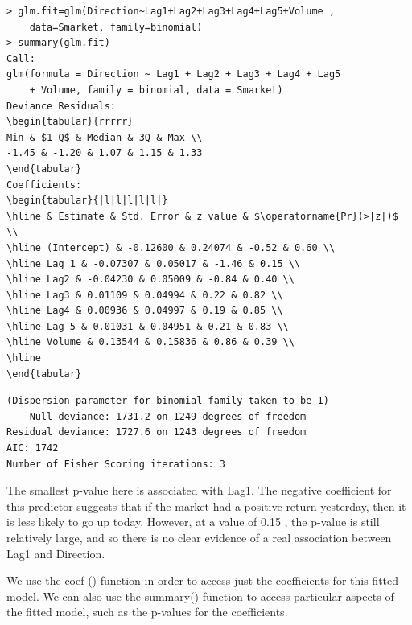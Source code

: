 \documentclass[10pt]{article}
\begin{document}
\begin{verbatim}
> glm.fit=glm(Direction~Lag1+Lag2+Lag3+Lag4+Lag5+Volume ,
    data=Smarket, family=binomial)
> summary(glm.fit)
Call:
glm(formula = Direction ~ Lag1 + Lag2 + Lag3 + Lag4 + Lag5
    + Volume, family = binomial, data = Smarket)
Deviance Residuals:
\begin{tabular}{rrrrr} 
Min & $1 Q$ & Median & 3Q & Max \\
-1.45 & -1.20 & 1.07 & 1.15 & 1.33
\end{tabular}
Coefficients:
\begin{tabular}{|l|l|l|l|l|}
\hline & Estimate & Std. Error & z value & $\operatorname{Pr}(>|z|)$ \\
\hline (Intercept) & -0.12600 & 0.24074 & -0.52 & 0.60 \\
\hline Lag 1 & -0.07307 & 0.05017 & -1.46 & 0.15 \\
\hline Lag2 & -0.04230 & 0.05009 & -0.84 & 0.40 \\
\hline Lag3 & 0.01109 & 0.04994 & 0.22 & 0.82 \\
\hline Lag4 & 0.00936 & 0.04997 & 0.19 & 0.85 \\
\hline Lag 5 & 0.01031 & 0.04951 & 0.21 & 0.83 \\
\hline Volume & 0.13544 & 0.15836 & 0.86 & 0.39 \\
\hline
\end{tabular}
\end{verbatim}

\begin{verbatim}
(Dispersion parameter for binomial family taken to be 1)
    Null deviance: 1731.2 on 1249 degrees of freedom
Residual deviance: 1727.6 on 1243 degrees of freedom
AIC: 1742
Number of Fisher Scoring iterations: 3
\end{verbatim}

The smallest p-value here is associated with Lag1. The negative coefficient for this predictor suggests that if the market had a positive return yesterday, then it is less likely to go up today. However, at a value of 0.15 , the p-value is still relatively large, and so there is no clear evidence of a real association between Lag1 and Direction.

We use the coef () function in order to access just the coefficients for this fitted model. We can also use the summary() function to access particular aspects of the fitted model, such as the p-values for the coefficients.
\end{document}
